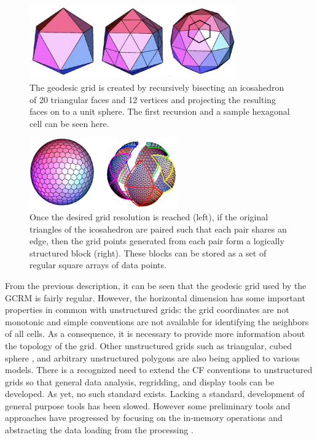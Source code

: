 \begin{figure}[!t]
\center
\includegraphics[width=3.5in]{images/geodesic2}
\caption{The geodesic grid is created by recursively bisecting an icosahedron
of 20 triangular faces and 12 vertices and projecting the resulting faces on
to a unit sphere.  The first recursion and a sample hexagonal cell can be seen
here.}
\label{fig:geodesic}
\end{figure}

\begin{figure}[!t]
\center
\includegraphics[width=2.5in]{images/panels}
\caption{Once the desired grid resolution is reached (left), if the original
triangles of the icosahedron are paired such that each pair shares an edge,
then the grid points generated from each pair form a logically structured
block (right).  These blocks can be stored as a set of regular square arrays
of data points.}
\label{fig:panels}
\end{figure}

From the previous description, it can be seen that the geodesic grid used by
the GCRM is fairly regular.  However, the horizontal dimension has some
important properties in common with unstructured grids: the grid coordinates
are not monotonic and simple conventions are not available for identifying the
neighbors of all cells.  As a consequence, it is necessary to provide more
information about the topology of the grid.  Other unstructured grids such as
triangular, cubed sphere \cite{CUBE}, and arbitrary unstructured polygons are
also being applied to various models.  There is a recognized need to extend
the CF conventions to unstructured grids so that general data analysis,
regridding, and display tools can be developed.  As yet, no such standard
exists.  Lacking a standard, development of general purpose tools has been
slowed.  However some preliminary tools and approaches have progressed by
focusing on the in-memory operations and abstracting the data loading from the
processing \cite{UGRID}. 

